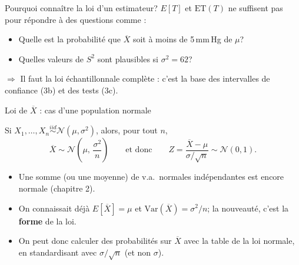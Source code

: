 \documentclass{BeamerTemplate}
\begin{document}
\begin{frame}[t]{Pourquoi connaître la loi d'un estimateur?}
  $E[T]$ et $\text{ET}(T)$ ne suffisent pas pour répondre à des questions comme :
  \begin{itemize}
    \item Quelle est la probabilité que $\overline{X}$ soit à moins de 5\,mm\,Hg de $\mu$?
    \item Quelles valeurs de $S^2$ sont plausibles si $\sigma^2 = 62$?
  \end{itemize}
  $\Rightarrow$ Il faut la \alert{loi échantillonnale} complète : c'est la base des intervalles de confiance (3b) et des tests (3c).

  \smallskip
\end{frame}

\begin{frame}[t]{Loi de $\overline{X}$ : cas d'une population normale}
  \begin{thm}
    Si $X_1, \ldots, X_n \overset{iid}{\sim} \mathcal{N}(\mu, \sigma^2)$, alors, \alert{pour tout $n$},
    $$\overline{X} \sim \mathcal{N}\!\left(\mu,\, \frac{\sigma^2}{n}\right)
      \qquad\text{et donc}\qquad
      Z = \frac{\overline{X} - \mu}{\sigma/\sqrt{n}} \sim \mathcal{N}(0, 1).$$
  \end{thm}

  \medskip
  \begin{itemize}\itemsep 2mm
    \item<2-> Une somme (ou une moyenne) de v.a.\ normales indépendantes est encore normale (chapitre 2).
    \item<2-> On connaissait déjà $E[\overline{X}] = \mu$ et $\text{Var}(\overline{X}) = \sigma^2/n$; la nouveauté, c'est la \textbf{forme} de la loi.
    \item<2-> On peut donc calculer des probabilités sur $\overline{X}$ avec la table de la loi normale, en \alert{standardisant avec $\sigma/\sqrt{n}$} (et non $\sigma$).
  \end{itemize}
\end{frame}
\end{document}
